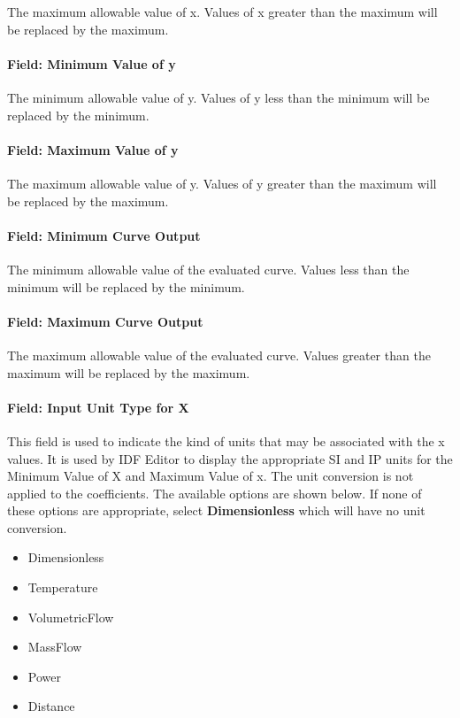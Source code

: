 The maximum allowable value of x. Values of x greater than the maximum will be replaced by the maximum.

\paragraph{Field: Minimum Value of y}\label{field-minimum-value-of-y-2}

The minimum allowable value of y. Values of y less than the minimum will be replaced by the minimum.

\paragraph{Field: Maximum Value of y}\label{field-maximum-value-of-y-2}

The maximum allowable value of y. Values of y greater than the maximum will be replaced by the maximum.

\paragraph{Field: Minimum Curve Output}\label{field-minimum-curve-output-6}

The minimum allowable value of the evaluated curve. Values less than the minimum will be replaced by the minimum.

\paragraph{Field: Maximum Curve Output}\label{field-maximum-curve-output-5}

The maximum allowable value of the evaluated curve. Values greater than the maximum will be replaced by the maximum.

\paragraph{Field: Input Unit Type for X}\label{field-input-unit-type-for-x-7}

This field is used to indicate the kind of units that may be associated with the x values. It is used by IDF Editor to display the appropriate SI and IP units for the Minimum Value of X and Maximum Value of x. The unit conversion is not applied to the coefficients. The available options are shown below. If none of these options are appropriate, select \textbf{Dimensionless} which will have no unit conversion.

\begin{itemize}
\item
  Dimensionless
\item
  Temperature
\item
  VolumetricFlow
\item
  MassFlow
\item
  Power
\item
  Distance
\end{itemize}


